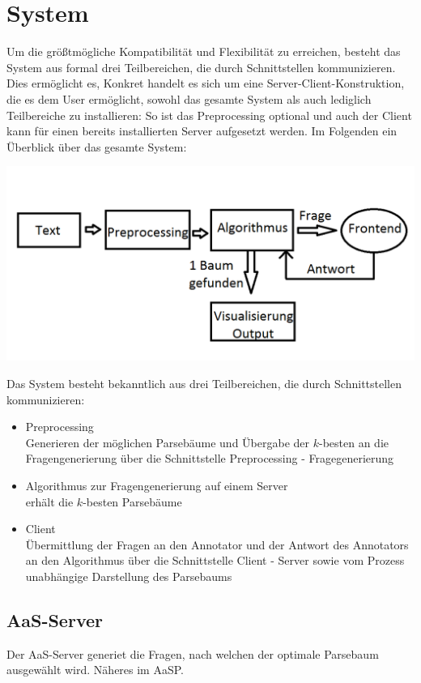 \documentclass{scrartcl}
\begin{document}
\section{System}
\label{sec:System}
Um die größtmögliche Kompatibilität und Flexibilität zu erreichen, besteht das System aus formal drei Teilbereichen, die durch Schnittstellen kommunizieren. Dies ermöglicht es, 
Konkret handelt es sich um eine Server-Client-Konstruktion, die es dem User ermöglicht, sowohl das gesamte System als auch lediglich Teilbereiche zu installieren: So ist das Preprocessing optional und auch der Client kann für einen bereits installierten Server aufgesetzt werden.
Im Folgenden ein Überblick über das gesamte System:
\begin{center}
    \includegraphics[scale=0.4]{Grafik}
\end{center}
Das System besteht bekanntlich aus drei Teilbereichen, die durch Schnittstellen kommunizieren:
\begin{itemize}
\item Preprocessing\\Generieren der möglichen Parsebäume und Übergabe der $k$-besten an die Fragengenerierung über die Schnittstelle Preprocessing - Fragegenerierung
\item Algorithmus zur Fragengenerierung auf einem Server\\erhält die $k$-besten Parsebäume 
\item Client\\Übermittlung der
Fragen an den Annotator und der Antwort des Annotators an den Algorithmus über die Schnittstelle Client - Server sowie vom Prozess unabhängige Darstellung des Parsebaums 
\end{itemize}

\subsection{AaS-Server}
\label{sub:AaS-Server}
Der AaS-Server generiet die Fragen, nach welchen der optimale Parsebaum ausgewählt wird. 
Näheres im AaSP.
\end{document}
